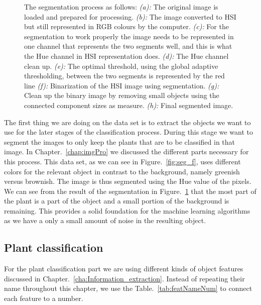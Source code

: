 \begin{figure}[]
\begin{subfigure}[b]{0.3\textwidth}
		\caption{}
		\label{fig:seg_h}
    \end{subfigure}
    \caption{The segmentation process as follows: \textit{(a):} The original image is loaded and prepared for processing. \textit{(b):} The image converted to HSI but still represented in RGB colours by the computer. \textit{(c):} For the segmentation to work properly the image needs to be represented in one channel that represents the two segments well, and this is what the Hue channel in HSI representation does. \textit{(d):} The Hue channel clean up. \textit{(e):} The optimal threshold, using the global adaptive thresholding, between the two segments is represented by the red line  \textit{(f):} Binarization of the HSI image using segmentation. \textit{(g):} Clean up the binary image by removing small objects using the connected component sizes as measure. \textit{(h):} Final segmented image.  }
    \label{fig:1}
\end{figure}

The first thing we are doing on the data set is to extract the objects we want to use for the later stages of the classification process. During this stage we want to segment the images to only keep the plants that are to be classified in that image. In Chapter.~\ref{chap:imgPro} we discussed the different parts necessary for this process. This data set, as we can see in Figure.~\ref{fig:seg_f}, uses different colors for the relevant object in contrast to the background, namely greenish versus brownish. The image is thus segmented using the Hue value of the pixels. We can see from the result of the segmentation in Figure.~\ref{fig:seg_h} that the most part of the plant is a part of the object and a small portion of the background is remaining. This provides a solid foundation for the machine learning algorithms as we have a only a small amount of noise in the resulting object.

\subsection{Plant classification}

For the plant classification part we are using different kinds of object features discussed in Chapter.~\ref{cha:Information_extraction}. Instead of repeating their name throughout this chapter, we use the Table.~\ref{tab:featNameNum} to connect each feature to a number.

